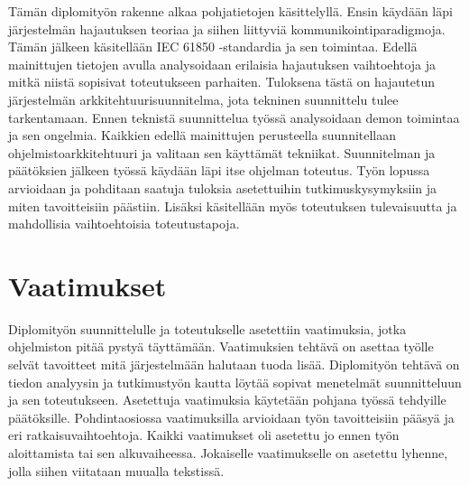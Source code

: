 Tämän diplomityön rakenne alkaa pohjatietojen käsittelyllä. Ensin käydään läpi järjestelmän hajautuksen teoriaa ja siihen liittyviä kommunikointiparadigmoja. Tämän jälkeen käsitellään IEC 61850 -standardia ja sen toimintaa. Edellä mainittujen tietojen avulla analysoidaan erilaisia hajautuksen vaihtoehtoja ja mitkä niistä sopisivat toteutukseen parhaiten. Tuloksena tästä on hajautetun järjestelmän arkkitehtuurisuunnitelma, jota tekninen suunnittelu tulee tarkentamaan. Ennen teknistä suunnittelua työssä analysoidaan demon toimintaa ja sen ongelmia. Kaikkien edellä mainittujen perusteella suunnitellaan ohjelmistoarkkitehtuuri ja valitaan sen käyttämät tekniikat. Suunnitelman ja päätöksien jälkeen työssä käydään läpi itse ohjelman toteutus. Työn lopussa arvioidaan ja pohditaan saatuja tuloksia asetettuihin tutkimuskysymyksiin ja miten tavoitteisiin päästiin. Lisäksi käsitellään myös toteutuksen tulevaisuutta ja mahdollisia vaihtoehtoisia toteutustapoja.


\section{Vaatimukset}
\label{ch:vaatimukset}
Diplomityön suunnittelulle ja toteutukselle asetettiin vaatimuksia, jotka ohjelmiston pitää pystyä täyttämään. Vaatimuksien tehtävä on asettaa työlle selvät tavoitteet mitä järjestelmään halutaan tuoda lisää. Diplomityön tehtävä on tiedon analyysin ja tutkimustyön kautta löytää sopivat menetelmät suunnitteluun ja sen toteutukseen. Asetettuja vaatimuksia käytetään pohjana työssä tehdyille päätöksille. Pohdintaosiossa vaatimuksilla arvioidaan työn tavoitteisiin pääsyä ja eri ratkaisuvaihtoehtoja. Kaikki vaatimukset oli asetettu jo ennen työn aloittamista tai sen alkuvaiheessa. Jokaiselle vaatimukselle on asetettu lyhenne, jolla siihen viitataan muualla tekstissä.

